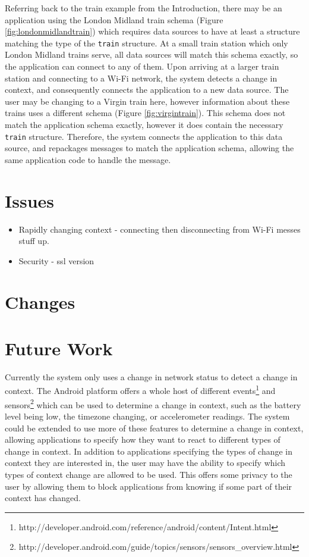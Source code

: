 \documentclass[12pt,twoside,notitlepage]{report}
\begin{document}
Referring back to the train example from the Introduction, there may be an application using the London Midland train schema (Figure \ref{fig:londonmidlandtrain}) which requires data sources to have at least a structure matching the type of the {\tt train} structure. 
At a small train station which only London Midland trains serve, all data sources will match this schema exactly, so the application can connect to any of them.
Upon arriving at a larger train station and connecting to a Wi-Fi network, the system detects a change in context, and consequently connects the application to a new data source. 
The user may be changing to a Virgin train here, however information about these trains uses a different schema (Figure \ref{fig:virgintrain}). 
This schema does not match the application schema exactly, however it does contain the necessary {\tt train} structure. 
Therefore, the system connects the application to this data source, and repackages messages to match the application schema, allowing the same application code to handle the message.


\section{Issues}

\begin{itemize}
\item Rapidly changing context - connecting then disconnecting from Wi-Fi messes stuff up.
\item Security - ssl version
\end{itemize}

\section{Changes}

\section{Future Work}

Currently the system only uses a change in network status to detect a change in context. 
The Android platform offers a whole host of different events\footnote{http://developer.android.com/reference/android/content/Intent.html} and sensors\footnote{http://developer.android.com/guide/topics/sensors/sensors\_overview.html} which can be used to determine a change in context, such as the battery level being low, the timezone changing, or accelerometer readings. 
The system could be extended to use more of these features to determine a change in context, allowing applications to specify how they want to react to different types of change in context. 
In addition to applications specifying the types of change in context they are interested in, the user may have the ability to specify which types of context change are allowed to be used. 
This offers some privacy to the user by allowing them to block applications from knowing if some part of their context has changed.
\end{document}
